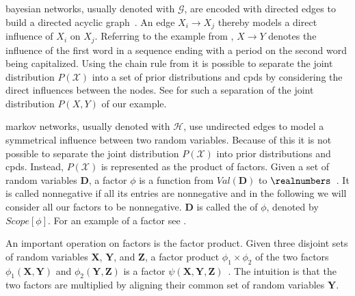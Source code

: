 \bigskip

\Glspl{bayesian network}, usually denoted with $\mathcal{G}$, are encoded with directed \glspl{edge} to build a directed acyclic graph~\citep{koller2009probabilistic}.
An \gls{edge} $X_i\to X_j$ thereby models a direct influence of $X_i$ on $X_j$.
Referring to the example from , $X\to Y$ denotes the influence of the first word in a sequence ending with a period on the second word being capitalized.
Using the chain rule from  it is possible to separate the \gls{joint distribution} $P(\mathcal{X})$ into a set of \glspl{prior distribution} and \glspl{cpd} by considering the direct influences between the \glspl{node}.
See  for such a separation of the \gls{joint distribution} $P(X,Y)$ of our example.

\bigskip

\Glspl{markov network}, usually denoted with $\mathcal{H}$, use undirected \glspl{edge} to model a symmetrical influence between two \glspl{random variable}.
Because of this it is not possible to separate the \gls{joint distribution} $P(\mathcal{X})$ into \glspl{prior distribution} and \glspl{cpd}.
Instead, $P(\mathcal{X})$ is represented as the product of \glspl{factor}.
Given a set of \glspl{random variable} $\bm{D}$, a \gls{factor} $\phi$ is a function from $Val(\bm{D})$ to $\realnumbers$~\citep{koller2009probabilistic}.
It is called nonnegative if all its entries are nonnegative and in the following we will consider all our factors to be nonnegative.
$\bm{D}$ is called the  of $\phi$, denoted by $Scope[\phi]$.
For an example of a factor see .

An important operation on factors is the \gls{factor product}.
Given three disjoint sets of random variables $\bm{X}$, $\bm{Y}$, and $\bm{Z}$, a \gls{factor product} $\phi_1\times \phi_2$ of the two factors $\phi_1(\bm{X},\bm{Y})$ and $\phi_2(\bm{Y},\bm{Z})$ is a factor $\psi(\bm{X},\bm{Y},\bm{Z})$~\citep{koller2009probabilistic}.
The intuition is that the two factors are multiplied by aligning their common set of \glspl{random variable} $\bm{Y}$.

